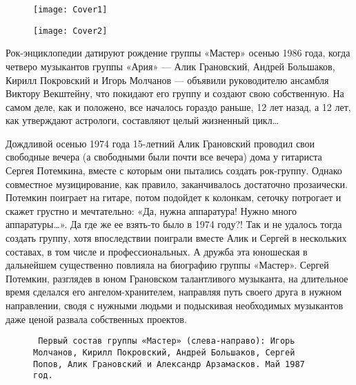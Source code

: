 




\begin{figure}[!ht]
    \centering
    \texttt{[image: Cover1]}
    \caption*{}
\end{figure}

\begin{figure}[!ht]
    \centering
    \texttt{[image: Cover2]}
    \caption*{}
\end{figure}

\restoregeometry

\maketitle

Рок-энциклопедии датируют рождение группы «Мастер» осенью 1986 года, когда четверо музыкантов группы «Ария» — Алик
Грановский, Андрей Большаков, Кирилл Покровский и Игорь Молчанов — объявили руководителю ансамбля Виктору Векштейну,
что покидают его группу и создают свою собственную. На самом деле, как и положено, все началось гораздо раньше, 12 лет
назад, а 12 лет, как утверждают астрологи, составляют целый жизненный цикл\ldots

Дождливой осенью 1974 года 15-летний Алик Грановский проводил свои свободные вечера (а свободными были почти все вечера)
дома у гитариста Сергея Потемкина, вместе с которым они пытались создать рок-группу. Однако совместное музицирование,
как правило, заканчивалось достаточно прозаически. Потемкин поиграет на гитаре, потом подойдет к колонкам, сеточку
потрогает и скажет грустно и мечтательно: «Да, нужна аппаратура! Нужно много аппаратуры\ldots». Да где же ее взять-то
было в 1974 году?! Так и не удалось тогда создать группу, хотя впоследствии поиграли вместе Алик и Сергей в нескольких
составах, в том числе и профессиональных. А дружба эта юношеская в дальнейшем существенно повлияла на биографию группы
«Мастер». Сергей Потемкин, разглядев в юном Грановском талантливого музыканта, на длительное время сделался его
ангелом-хранителем, направляя путь своего друга в нужном направлении, сводя с нужными людьми и подыскивая необходимых
музыкантов даже ценой развала собственных проектов.

\begin{figure}[h]
    \centering
    \caption*{\texttt{
        Первый состав группы «Мастер» (слева-направо): Игорь Молчанов, Кирилл Покровский, Андрей Большаков, Сергей
        Попов, Алик Грановский и Александр Арзамасков. Май 1987 год.
    }}
\end{figure}

